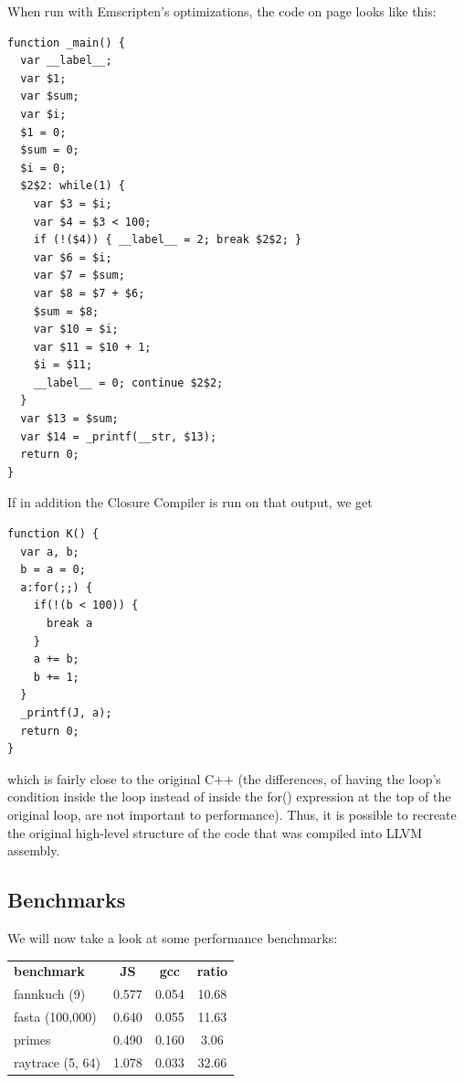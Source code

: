 \documentclass[preprint,10pt]{sigplanconf}
\begin{document}
When run with Emscripten's optimizations, the code on page \pageref{code:example} looks
like this:
\begin{verbatim}
function _main() {
  var __label__;
  var $1;
  var $sum;
  var $i;
  $1 = 0;
  $sum = 0;
  $i = 0;
  $2$2: while(1) {
    var $3 = $i;
    var $4 = $3 < 100;
    if (!($4)) { __label__ = 2; break $2$2; }
    var $6 = $i;
    var $7 = $sum;
    var $8 = $7 + $6;
    $sum = $8;
    var $10 = $i;
    var $11 = $10 + 1;
    $i = $11;
    __label__ = 0; continue $2$2;
  }
  var $13 = $sum;
  var $14 = _printf(__str, $13);
  return 0;
}
\end{verbatim}
If in addition the Closure Compiler is run on that output, we get
\begin{verbatim}
function K() {
  var a, b;
  b = a = 0;
  a:for(;;) {
    if(!(b < 100)) {
      break a
    }
    a += b;
    b += 1;
  }
  _printf(J, a);
  return 0;
}
\end{verbatim}
which is fairly close to the original C++ (the differences, of
having the loop's condition inside the loop instead of inside
the for() expression at the top of the original loop, are not important to performance). Thus, it is possible
to recreate the original high-level structure of the code that
was compiled into LLVM assembly.

\subsection{Benchmarks}
\label{sec:benchmarks}

We will now take a look at some performance benchmarks:

\bigskip

\begin{tabular}{ l | c | c | c }
  \hline
  \textbf{benchmark} & \textbf{JS} & \textbf{gcc} & \textbf{ratio} \\
  fannkuch (9)     & 0.577 & 0.054 &  10.68 \\
  fasta (100,000)  & 0.640 & 0.055 &  11.63 \\
  primes           & 0.490 & 0.160 &   3.06 \\
  raytrace (5, 64) & 1.078 & 0.033 &  32.66 \\
  \hline
\end{tabular}

\bigskip
\end{document}
